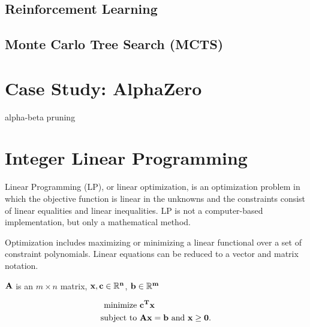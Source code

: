 \documentclass[11pt]{article}
\newtheorem{theorem}{Theorem}
\begin{document}
	
	\subsection{Reinforcement Learning}
	
	
	
	\subsection{Monte Carlo Tree Search (MCTS)}
	
	
	
	\section{Case Study: AlphaZero}\label{section-alphazero}
		
	alpha-beta pruning
	
	
	
	\section{Integer Linear Programming}\label{section-ILP}
	
	Linear Programming (LP), or linear optimization, is an optimization problem in which the objective function is linear in the unknowns and the constraints consist of linear equalities and linear inequalities. LP is not a computer-based implementation, but only a mathematical method.
	
	Optimization includes maximizing or minimizing a linear functional over a set of constraint polynomials. Linear equations can be reduced to a vector and matrix notation.


	$\bf{A}$ is an $m \times n$ matrix, $\bf{x}, \bf{c} \in \mathbb{R}^{n}$, $\bf{b} \in \mathbb{R}^{m}$ 

\begin{equation}
\begin{aligned}
	\text{minimize } &\bf{c}^{T}\bf{x}\\
	\text{subject to } &\bf{Ax} = \bf{b} \text{ and } \bf{x} \geq 0.
\end{aligned}
\end{equation}
	
\end{document}
